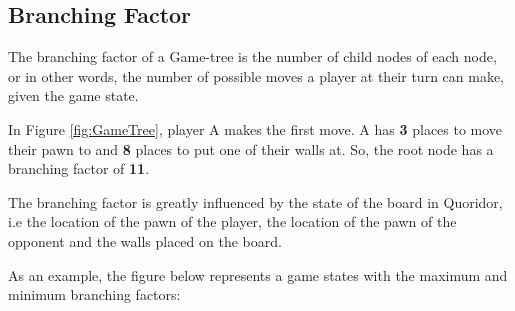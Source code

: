 \subsection{Branching Factor}
\label{BranchingFactor}

The branching factor of a Game-tree is the number of child nodes of each node, or in other words, the number of possible moves a player at their turn can make, given the game state.

In Figure \ref{fig:GameTree}, player A makes the first move. A has \textbf{3} places to move their pawn to and \textbf{8} places to put one of their walls at. So, the root node has a branching factor of \textbf{11}.

The branching factor is greatly influenced by the state of the board in Quoridor, i.e the location of the pawn of the player, the location of the pawn of the opponent and the walls placed on the board.

As an example, the figure below represents a game states with the maximum and minimum branching factors:


